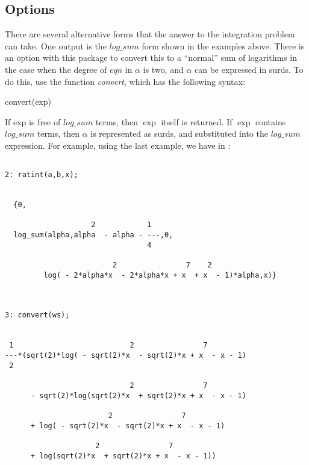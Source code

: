 \subsection{Options}
There are several alternative forms that the answer to the integration problem can take. One output is the $log\_sum$ form shown in the examples above. There is an option with this package to convert this to a ``normal'' sum of logarithms in the case when the degree of $eqn$ in $\alpha$ is two, and $\alpha$ can be expressed in surds. To do this, use the function \emph{convert}, which has the following syntax:
\begin{center}  convert(exp) \end{center}
If exp is free of $log\_sum$ terms, then $\exp$ itself is returned. If $\exp$ contains $log\_sum$ terms, then $\alpha$ is represented as surds, and substituted into the $log\_sum$ expression. For example, using the last example, we have in \REDUCE:
\begin{verbatim}

2: ratint(a,b,x); 


  {0,

                    2            1
  log_sum(alpha,alpha  - alpha - ---,0,
                                 4

                         2                7    2
         log( - 2*alpha*x  - 2*alpha*x + x  + x  - 1)*alpha,x)} 



3: convert(ws);


 1                           2                7
---*(sqrt(2)*log( - sqrt(2)*x  - sqrt(2)*x + x  - x - 1)
 2

                             2                7
      - sqrt(2)*log(sqrt(2)*x  + sqrt(2)*x + x  - x - 1)

                        2                7
      + log( - sqrt(2)*x  - sqrt(2)*x + x  - x - 1)

                     2                7
      + log(sqrt(2)*x  + sqrt(2)*x + x  - x - 1))

\end{verbatim}
